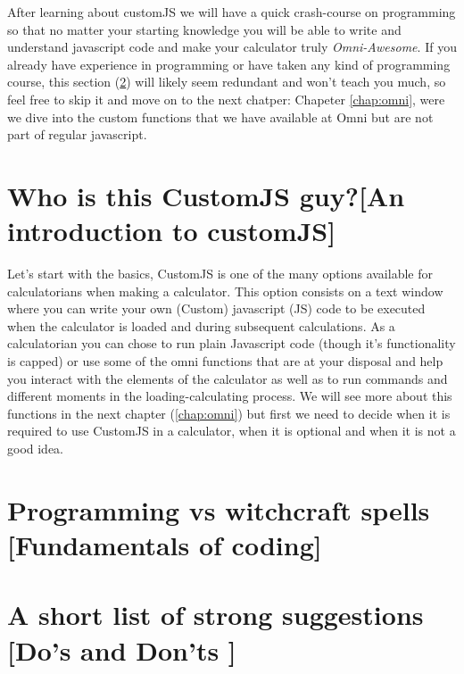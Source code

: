 \documentclass[11pt,a4paper,oldfontcommands]{memoir}
\begin{document}
After learning about customJS we will have a quick crash-course on programming so that no matter your starting knowledge you will be able to write and understand javascript code and make your calculator truly \textit{Omni-Awesome}\textsuperscript{\textregistered}. If you already have experience in programming or have taken any kind of programming course, this section (\ref{sec:fundamentals}) will likely seem redundant and won't teach you much, so feel free to skip it and move on to the next chatper: Chapeter \ref{chap:omni}, were we dive into the custom functions that we have available at Omni but are not part of regular javascript.
    
    \section{Who is this CustomJS guy?\small[An introduction to customJS]}
        \label{sec:whatIs}
    Let's start with the basics, CustomJS is one of the many options available for calculatorians when making a calculator. This option consists on a text window where you can write your own (Custom) javascript (JS) code to be executed when the calculator is loaded and during subsequent calculations. 
    As a calculatorian you can chose to run plain Javascript code (though it's functionality is capped) or use some of the omni functions that are at your disposal and help you interact with the elements of the calculator as well as to run commands and different moments in the loading-calculating process. We will see more about this functions in the next chapter (\ref{chap:omni}) but first we need to decide when it is required to use CustomJS in a calculator, when it is optional and when it is not a good idea.
    
        
    
    
    
    \section{Programming vs witchcraft spells \small[Fundamentals of coding]}    
        \label{sec:fundamentals}
        
    
    \section{A short list of strong suggestions \small{[Do's and Don'ts ]}}
        \label{sec:suggestions}
        
\end{document}
